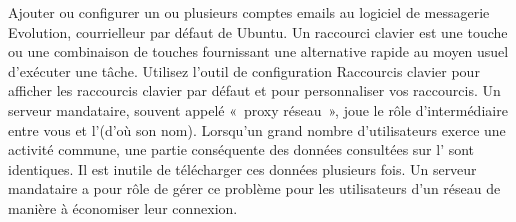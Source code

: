 Ajouter ou configurer un ou plusieurs comptes emails au logiciel de messagerie Evolution, courrielleur par défaut de Ubuntu. 
Un raccourci clavier est une touche ou une combinaison de touches fournissant une alternative rapide au moyen usuel d'exécuter une tâche. Utilisez l'outil de configuration Raccourcis clavier pour afficher les raccourcis clavier par défaut et pour personnaliser vos raccourcis.
Un serveur mandataire, souvent appelé «~proxy réseau~», joue le rôle d'intermédiaire entre vous et l'(d'où son nom). Lorsqu'un grand nombre d'utilisateurs exerce une activité commune, une partie conséquente des données consultées sur l' sont identiques. Il est inutile de télécharger ces données plusieurs fois. Un serveur mandataire a pour rôle de gérer ce problème pour les utilisateurs d'un réseau de manière à économiser leur connexion.\\
